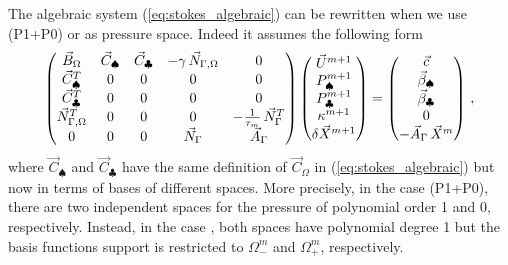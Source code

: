 The algebraic system (\ref{eq:stokes_algebraic}) can be rewritten when we
use (P1+P0) or \pdg as pressure space. Indeed it assumes the following form
\begin{equation}
\begin{pmatrix}
\vec B_\Omega & \vec C_{\spadesuit} & \vec C_{\clubsuit} & -\gamma\,\vec{N}_{\Gamma,\Omega} & 0\\
\vec C^T_{\spadesuit} & 0 & 0 & 0 & 0 \\
\vec C^T_{\clubsuit} & 0 & 0 & 0 & 0 \\
\vec{N}_{\Gamma,\Omega}^T & 0 & 0 & 0 & -\frac1{\tau_m}\,\vec N_\Gamma^T \\
0 & 0 & 0 & \vec N_\Gamma & \vec A_\Gamma
\end{pmatrix}
\begin{pmatrix}
\vec U^{m+1} \\
P^{m+1}_\spadesuit \\
P^{m+1}_\clubsuit \\
\kappa^{m+1} \\
\delta\vec X^{m+1}
\end{pmatrix}
=
\begin{pmatrix}
\vec c \\
\vec \beta_\spadesuit \\
\vec \beta_\clubsuit \\
0 \\
-\vec A_\Gamma\,\vec X^m
\end{pmatrix} \,,
\label{eq:stokes_algebraic_extended}
\end{equation}
where $\vec C_{\spadesuit}$ and $\vec C_{\clubsuit}$ have the same definition
of $\vec C_\Omega$ in (\ref{eq:stokes_algebraic}) but now in terms of bases of
different spaces. More precisely, in the case (P1+P0), there are two
independent spaces for the pressure of polynomial order 1 and 0, respectively.
Instead, in the case \pdg, both spaces have polynomial degree 1 but the basis
functions support is restricted to $\Omega_-^m$ and $\Omega_+^m$, respectively.

